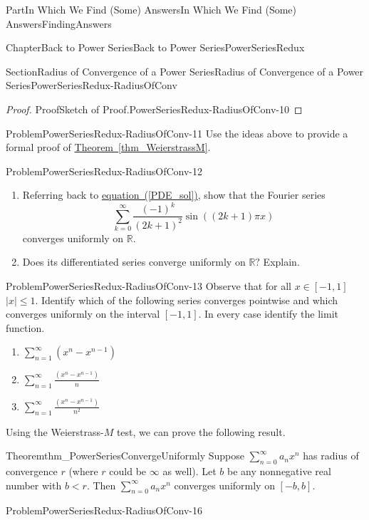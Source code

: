 \documentclass[oneside,10pt,]{book}
\newcommand{\xreffont}{\relax}
\numberwithin{equation}{part}
\newcommand{\abs}[1]{\left|#1\right|}
\newcommand{\RR}{\mathbb {R}}
\newcommand{\lt}{<}
\begin{document}
\begin{partptx}{Part}{In Which We Find (Some) Answers}{}{In Which We Find (Some) Answers}{}{}{FindingAnswers}
\begin{chapterptx}{Chapter}{Back to Power Series}{}{Back to Power Series}{}{}{PowerSeriesRedux}
\begin{sectionptx}{Section}{Radius of Convergence of a Power Series}{}{Radius of Convergence of a Power Series}{}{}{PowerSeriesRedux-RadiusOfConv}
\begin{proof}{Proof}{Sketch of Proof.}{PowerSeriesRedux-RadiusOfConv-10}
%
\end{proof}
\begin{problem}{Problem}{}{PowerSeriesRedux-RadiusOfConv-11}%
Use the ideas above to provide a formal proof of \hyperref[thm_WeierstrassM]{Theorem~{\xreffont\ref{thm_WeierstrassM}}}.%
\end{problem}
\begin{problem}{Problem}{}{PowerSeriesRedux-RadiusOfConv-12}%
\begin{enumerate}[font=\bfseries,label=(\alph*),ref=\alph*]%
\item{}Referring back to \hyperref[PDE_sol]{equation~({\xreffont\ref{PDE_sol}})}, show that the Fourier series%
\begin{equation*}
\sum_{k=0}^\infty\frac{(-1)^k}{(2k+1)^2}\sin\left((2k+1)\pi x\right)
\end{equation*}
converges uniformly on \(\RR\).%
\item{}Does its differentiated series converge uniformly on \(\RR?\) Explain.%
\end{enumerate}%
\end{problem}
\begin{problem}{Problem}{}{PowerSeriesRedux-RadiusOfConv-13}%
Observe that for all \(x \in [-1,1]\) \(\abs{x}\le
1\).  Identify which of the following series converges pointwise and which converges uniformly on the interval \([-1,1]\).  In every case identify the limit function.%
\begin{enumerate}[font=\bfseries,label=(\alph*),ref=\alph*]%
\item{}\(\displaystyle \sum_{n=1}^\infty\left(x^n-x^{n-1}\right)\)%
\item{}\(\displaystyle \sum_{n=1}^\infty\frac{\left(x^n-x^{n-1}\right)}{n}\)%
\item{}\(\displaystyle\sum_{n=1}^\infty\frac{\left(x^n-x^{n-1}\right)}{n^2}\)%
\end{enumerate}%
\end{problem}
Using the Weierstrass-\(M\) test, we can prove the following result.%
\begin{theorem}{Theorem}{}{}{thm_PowerSeriesConvergeUniformly}%
%
Suppose \(\displaystyle\sum_{n=0}^\infty a_nx^n\) has radius of convergence \(r\) (where \(r\) could be \(\infty\) as well).  Let \(b\) be any nonnegative real number with \(b\lt r\).  Then \(\displaystyle\sum_{n=0}^\infty a_nx^n\) converges uniformly on \([-b,b]\).%
\end{theorem}
\begin{problem}{Problem}{}{PowerSeriesRedux-RadiusOfConv-16}%

\end{problem}
\end{sectionptx}
\end{chapterptx}
\end{partptx}
\end{document}

